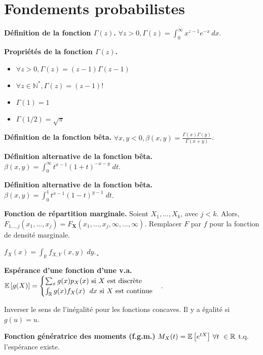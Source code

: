 \section{Fondements probabilistes}
\textbf{Définition de la fonction $\Gamma(z)$.} $\forall z > 0, \Gamma(z) = \int_0^\infty x^{z-1}e^{-x} \, dx$.

\textbf{Propriétés de la fonction $\Gamma(z)$.}
\begin{itemize}
	\item $\forall z > 0, \Gamma(z) = (z-1)\Gamma(z-1)$
	\item $\forall z \in \mathbb{N}^*, \Gamma(z) = (z-1)!$
	\item $\Gamma(1)=1$
	\item $\Gamma(1/2)=\sqrt{\pi}$
\end{itemize}

\textbf{Définition de la fonction bêta.}  $\forall x,y<0, \beta(x,y)=\frac{\Gamma(x)\Gamma(y)}{\Gamma(x+y)}$.

\textbf{Définition alternative de la fonction bêta.} $\beta(x,y) = \int_0^\infty t^{x-1}(1+t)^{-x-y} \; dt$.

\textbf{Définition alternative de la fonction bêta.} $\beta(x,y) = \int_0^1 t^{x-1}(1-t)^{y-1} \; dt$.

\textbf{Fonction de répartition marginale.} Soient $X_1, \dots, X_k$, avec $j<k$. Alors, $F_{1\dots,j}(x_1,\dots,x_j) = F_{\mathbf{X}}(x_1,\dots,x_j,\infty, \dots, \infty).$ Remplacer $F$ par $f$ pour la fonction de densité marginale.

 $f_X(x) = \int_{\mathbb{R}} f_{X,Y}(x,y) \; dy$.¸



\textbf{Espérance d'une fonction d'une v.a.} $\e{g(X)} = 
	\begin{cases}
		\sum_x g(x) p_X(x) \text{ si $X$ est discrète} \\
		\int_\mathbb{R} g(x) f_X(x) \; dx \text{ si $X$ est continue}
	\end{cases}
$.

 Inverser le sens de l'inégalité pour les fonctions concaves. Il y a égalité si $g(u)=u$.


\textbf{Fonction génératrice des moments (f.g.m.)} $M_X(t)=\e{e^{tX}} \, \forall t \in \mathbb{R}$ t.q. l'espérance existe.

